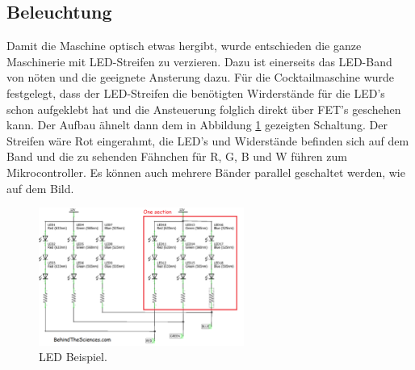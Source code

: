 \newpage
\subsection{Beleuchtung}
\label{subsec:Beleuchtung}

Damit die Maschine optisch etwas hergibt, wurde entschieden die ganze Maschinerie mit LED-Streifen zu verzieren. Dazu ist einerseits das LED-Band von nöten und die geeignete Ansterung dazu. Für die Cocktailmaschine wurde festgelegt, dass der LED-Streifen die benötigten Wirderstände für die LED's schon aufgeklebt hat und die Ansteuerung folglich direkt über FET's geschehen kann. Der Aufbau ähnelt dann dem in Abbildung \ref{fig:LED1} gezeigten Schaltung. Der Streifen wäre Rot eingerahmt, die LED's und Widerstände befinden sich auf dem Band und die zu sehenden Fähnchen für R, G, B und W führen zum Mikrocontroller. Es können auch mehrere Bänder parallel geschaltet werden, wie auf dem Bild.

\begin{figure}[h!]
\center
\includegraphics[width = 0.6\textwidth]{graphics/Schema_LED1}
\caption{LED Beispiel.}
\label{fig:LED1}
\end{figure}